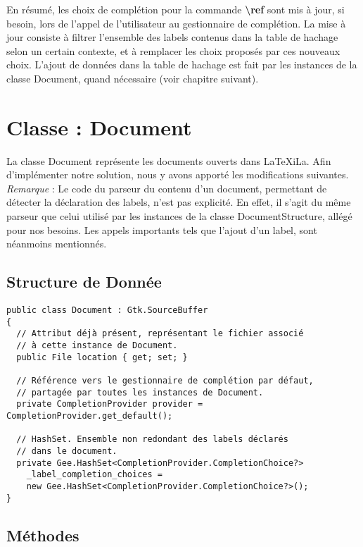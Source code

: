 \documentclass[a4paper,11pt]{report}
\begin{document}
En résumé, les choix de complétion pour la commande \textbf{\textbackslash{}ref} sont mis à jour, si besoin, lors de l'appel de l'utilisateur au gestionnaire de complétion.
La mise à jour consiste à filtrer l'ensemble des labels contenus dans la table de hachage selon un certain contexte, et à remplacer les choix proposés par ces nouveaux choix.
L'ajout de données dans la table de hachage est fait par les instances de la classe Document, quand nécessaire (voir chapitre suivant).

\chapter{Classe : Document}
\label{cha:classe_document}

La classe Document représente les documents ouverts dans LaTeXiLa.
Afin d'implémenter notre solution, nous y avons apporté les modifications suivantes.
\\\textit{Remarque} : Le code du parseur du contenu d'un document, permettant de détecter la déclaration des labels, n'est pas explicité. En effet, il s'agit du même parseur que celui utilisé par les instances de la classe DocumentStructure, allégé pour nos besoins. Les appels importants tels que l'ajout d'un label, sont néanmoins mentionnés.

\section{Structure de Donnée}
\label{sec:D_structure_de_données}

\begin{lstlisting}[frame=single]
public class Document : Gtk.SourceBuffer
{
  // Attribut déjà présent, représentant le fichier associé
  // à cette instance de Document.
  public File location { get; set; }

  // Référence vers le gestionnaire de complétion par défaut,
  // partagée par toutes les instances de Document.
  private CompletionProvider provider = CompletionProvider.get_default();
  
  // HashSet. Ensemble non redondant des labels déclarés
  // dans le document.
  private Gee.HashSet<CompletionProvider.CompletionChoice?> 
    _label_completion_choices =
    new Gee.HashSet<CompletionProvider.CompletionChoice?>();
}
\end{lstlisting}

\section{Méthodes}
\label{sec:D_méthodes}
\end{document}
